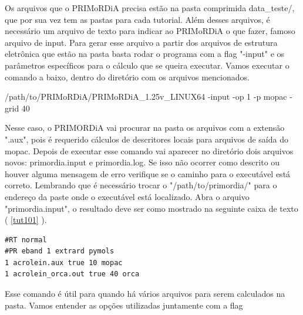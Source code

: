 \documentclass[a4paper,11pt]{refart}
\begin{document}
Os arquivos que o PRIMoRDiA precisa estão na pasta comprimida data\_teste/, que por sua vez tem as pastas para cada tutorial. Além desses arquivos, é necessário um arquivo de texto para indicar ao PRIMoRDiA o que fazer, famoso arquivo de input. Para gerar esse arquivo a partir dos arquivos de estrutura eletrônica que estão na pasta basta rodar o programa com a flag "-input" e os parâmetros específicos para o cálculo que se queira executar. Vamos executar o comando a baixo, dentro do diretório com os arquivos mencionados.

\hspace*{-\leftmarginwidth}
\begin{minipage}{\fullwidth}
\begin{commandshell}/path/to/PRIMoRDiA/PRIMoRDiA_1.25v_LINUX64 -input -op 1 -p mopac -grid 40\end{commandshell}
\end{minipage}

Nesse caso, o PRIMORDiA vai procurar na pasta os arquivos com a extensão ".aux", pois é requerido cálculos de descritores locais para arquivos de saída do mopac. Depois de executar esse comando vai aparecer no diretório dois arquivos novos: primordia.input e primordia.log. Se isso não ocorrer como descrito ou houver alguma mensagem de erro verifique se o caminho para o executável está correto. Lembrando que é necessário trocar o "/path/to/primordia/" para o endereço da paste onde o executável está localizado. Abra o arquivo "primordia.input", o resultado deve ser como mostrado na seguinte caixa de texto ( \autoref{tut101} ).

\begin{minipage}{\textwidth}
\begin{lstlisting}[caption={Input gerado pelo comando do PRIMoRDiA.},label={tut101}]
#RT normal 
#PR eband 1 extrard pymols
1 acrolein.aux true 10 mopac 
1 acrolein_orca.out true 40 orca 
\end{lstlisting}
\end{minipage}


Esse comando é útil para quando há vários arquivos para serem calculados na pasta. Vamos entender as opções utilizadas juntamente com a flag
\end{document}
